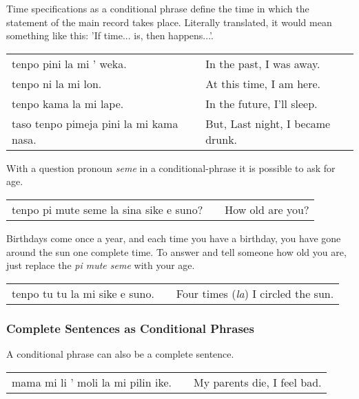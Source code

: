 Time specifications as a conditional phrase define the time in which the statement of the main record takes place. 
Literally translated, it would mean something like this: 'If time... is, then happens...'. 

\begin{supertabular}{p{5,5cm}|ll}
tenpo pini la mi ' weka. && In the past, I was away. \\
tenpo ni la mi lon. && At this time, I am here. \\
tenpo kama la mi lape. && In the future, I'll sleep. \\
taso tenpo pimeja pini la mi kama nasa. && But, Last night, I became drunk. \\
\end{supertabular} 


With a question pronoun \textit{seme} in a conditional-phrase it is possible to ask for age.

\begin{supertabular}{p{5,5cm}|ll}
tenpo pi mute seme la sina sike e suno? && How old are you? \\
\end{supertabular} 

Birthdays come once a year, and each time you have a birthday, you have gone around the sun one complete time. 
To answer and tell someone how old you are, just replace the \textit{pi mute seme} with your age.

\begin{supertabular}{p{5,5cm}|ll}
tenpo tu tu la mi sike e suno. && Four times (\textit{la}) I circled the sun. \\
\end{supertabular} 




%
\subsubsection*{Complete Sentences as Conditional Phrases}
%
A conditional phrase can also be a complete sentence.



\begin{supertabular}{p{5,5cm}|ll}
mama mi li ' moli la mi pilin ike. && My parents die, I feel bad. \\
\end{supertabular} 


